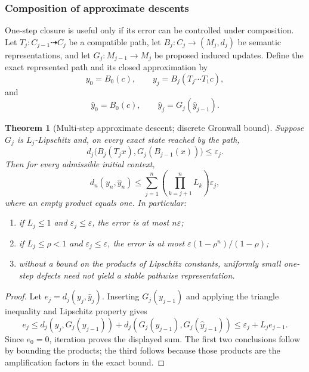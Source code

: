 \documentclass[11pt]{article}
\newtheorem{theorem}[definition]{Theorem}
\begin{document}
\subsubsection{Composition of approximate descents}

One-step closure is useful only if its error can be controlled under composition. Let $T_j:C_{j-1}\dashrightarrow C_j$ be a compatible path, let $B_j:C_j\to(M_j,d_j)$ be semantic representations, and let $G_j:M_{j-1}\to M_j$ be proposed induced updates. Define the exact represented path and its closed approximation by
\[
y_0=B_0(c),\qquad y_j=B_j(T_j\cdots T_1c),
\]
and
\[
\widehat y_0=B_0(c),\qquad \widehat y_j=G_j(\widehat y_{j-1}).
\]

\begin{theorem}[Multi-step approximate descent; discrete Gronwall bound]\label{thm:multistep}
Suppose $G_j$ is $L_j$-Lipschitz and, on every exact state reached by the path,
\[
d_j\bigl(B_j(T_jx),G_j(B_{j-1}(x))\bigr)\le\varepsilon_j.
\]
Then for every admissible initial context,
\[
d_n(y_n,\widehat y_n)
\le
\sum_{j=1}^{n}
\left(\prod_{k=j+1}^{n}L_k\right)\varepsilon_j,
\]
where an empty product equals one. In particular:
\begin{enumerate}
\item if $L_j\le1$ and $\varepsilon_j\le\varepsilon$, the error is at most $n\varepsilon$;
\item if $L_j\le\rho<1$ and $\varepsilon_j\le\varepsilon$, the error is at most $\varepsilon(1-\rho^n)/(1-\rho)$;
\item without a bound on the products of Lipschitz constants, uniformly small one-step defects need not yield a stable pathwise representation.
\end{enumerate}
\end{theorem}

\begin{proof}
Let $e_j=d_j(y_j,\widehat y_j)$. Inserting $G_j(y_{j-1})$ and applying the triangle inequality and Lipschitz property gives
\[
e_j
\le d_j(y_j,G_j(y_{j-1}))
   +d_j(G_j(y_{j-1}),G_j(\widehat y_{j-1}))
\le\varepsilon_j+L_je_{j-1}.
\]
Since $e_0=0$, iteration proves the displayed sum. The first two conclusions follow by bounding the products; the third follows because those products are the amplification factors in the exact bound.
\end{proof}
\end{document}
